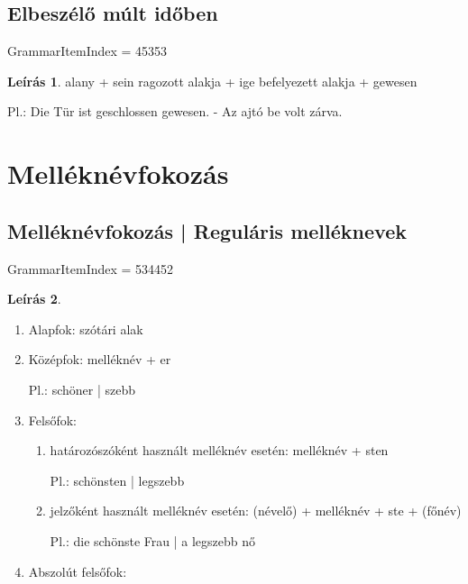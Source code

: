 \documentclass{article}
\theoremstyle{definition}
\newtheorem*{desc}{Leírás}
\begin{document}
\subsection{Elbeszélő múlt időben}

GrammarItemIndex = 45353

\begin{desc}
alany + sein ragozott alakja + ige befelyezett alakja + gewesen

Pl.: Die Tür ist geschlossen gewesen. - Az ajtó be volt zárva.
\end{desc}

\section{Melléknévfokozás}

\subsection{Melléknévfokozás | Reguláris melléknevek}

GrammarItemIndex = 534452

\begin{desc}

\begin{enumerate}
\item Alapfok: szótári alak
\item Középfok: melléknév + er

Pl.: schöner | szebb

\item Felsőfok:
\begin{enumerate}
\item határozószóként használt melléknév esetén: melléknév + sten

Pl.: schönsten | legszebb

\item jelzőként használt melléknév esetén: (névelő) + melléknév + ste + (főnév)

Pl.: die schönste Frau | a legszebb nő
\end{enumerate}

\item Abszolút felsőfok:
\end{enumerate}
\end{desc}
\end{document}
